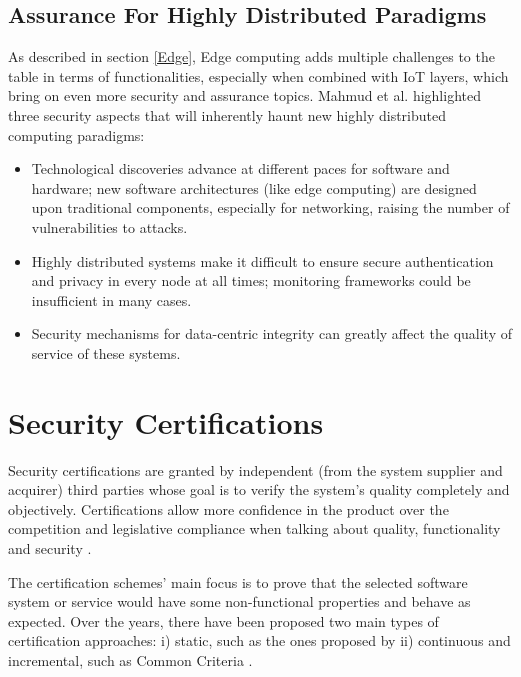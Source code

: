 \subsection{Assurance For Highly Distributed Paradigms}
As described in section \ref{Edge}, Edge computing adds multiple challenges to the table in terms of functionalities, especially when combined with IoT layers, which bring on even more security and assurance topics. Mahmud et al. \cite{mahmud2018fog} highlighted three security aspects that will inherently haunt new highly distributed computing paradigms:
\begin{itemize}

\item Technological discoveries advance at different paces for software and hardware; new software architectures (like edge computing) are designed upon traditional components, especially for networking, raising the number of vulnerabilities to attacks.

\item Highly distributed systems make it difficult to ensure secure authentication and privacy in every node at all times; monitoring frameworks could be insufficient in many cases.

\item Security mechanisms for data-centric integrity can greatly affect the quality of service of these systems.

\end{itemize}


\section{Security Certifications}
Security certifications are granted by independent (from the system supplier and acquirer) third parties whose goal is to verify the system's quality completely and objectively. Certifications allow more confidence in the product over the competition and legislative compliance when talking about quality, functionality and security \cite{heck2010software}.

The certification schemes' main focus is to prove that the selected software system or service would have some non-functional properties and behave as expected. 
Over the years, there have been proposed two main types of certification approaches: i) static, such as the ones proposed by \cite{anisetti2013test}\cite{CSATrustSTAR} ii) continuous and incremental, such as Common Criteria \cite{anisetti2017semi}\cite{infrastructure2002common}. 

